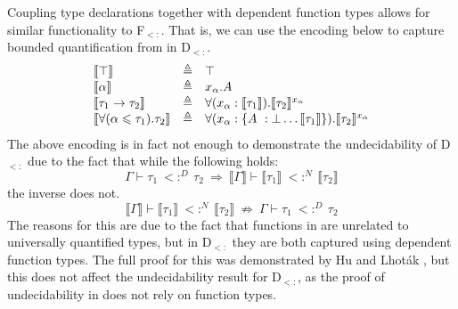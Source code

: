\documentclass[runningheads, anon]{llncs}
\begin{document}
Coupling type declarations together with dependent function types allows for similar functionality to F$_{<:}$. That is, we can use the encoding below to capture 
bounded quantification from \Fsub in D$_{<:}$.
\[
\begin{array}{lcl}
\llbracket\top\rrbracket 
		& \triangleq 
		& \top\\
\llbracket\alpha\rrbracket 
		& \triangleq 
		& x_\alpha.A\\
\llbracket\tau_1 \rightarrow \tau_2\rrbracket 
		& \triangleq 
		& \forall (x_\alpha:\llbracket\tau_1\rrbracket).\llbracket\tau_2\rrbracket^{x_\alpha}\\
\llbracket\forall(\alpha\leqslant\tau_1).\tau_2\rrbracket 
		& \triangleq 
		& \forall (x_\alpha:\{A\ : \bot \ldots \llbracket\tau_1\rrbracket\}).\llbracket\tau_2\rrbracket^{x_\alpha}
\end{array}
\]
The above encoding is in fact not enough to demonstrate the undecidability of D$_{<:}$ due to the fact that while the following holds:
\[
\Gamma \vdash \tau_1\ <:^D\ \tau_2\ \Rightarrow\ \llbracket\Gamma\rrbracket \vdash \llbracket\tau_1\rrbracket\ <:^N\ \llbracket\tau_2\rrbracket
\]
the inverse does not.
\[
\llbracket\Gamma\rrbracket \vdash \llbracket\tau_1\rrbracket\ <:^N\ \llbracket\tau_2\rrbracket\ \not\Rightarrow\ \Gamma \vdash \tau_1\ <:^D\ \tau_2
\]
The reasons for this are due to the fact that functions in \Fsub are unrelated to universally quantified types, 
but in D$_{<:}$ they are both captured using dependent function types. The full proof for this was demonstrated 
by Hu and Lhot\'{a}k \cite{10.1145/3371077}, but this does not affect the undecidability result for D$_{<:}$, as the proof of undecidability 
in \Fsub does not rely on function types.
\end{document}
